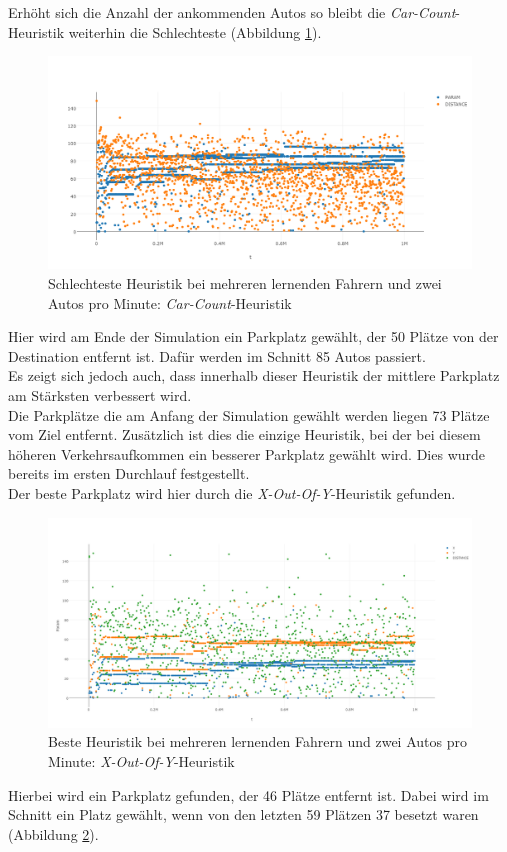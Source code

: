 Erhöht sich die Anzahl der ankommenden Autos so bleibt die \emph{Car-Count}-Heuristik weiterhin die Schlechteste (Abbildung \ref{fig:res_pm_2pm_worst}). 
\begin{figure}
	\includegraphics[width=\textwidth]{analyse/SomeMutants/2pm/car2some.png}
	\caption{Schlechteste Heuristik bei mehreren lernenden Fahrern und zwei Autos pro Minute: \emph{Car-Count}-Heuristik}\label{fig:res_pm_2pm_worst}
\end{figure}
Hier wird am Ende der Simulation ein Parkplatz gewählt, der 50 Plätze von der Destination entfernt ist. Dafür werden im Schnitt 85 Autos passiert.\\
Es zeigt sich jedoch auch, dass innerhalb dieser Heuristik der mittlere Parkplatz am Stärksten verbessert wird.\\
Die Parkplätze die am Anfang der Simulation gewählt werden liegen 73 Plätze vom Ziel entfernt. Zusätzlich ist dies die einzige Heuristik, bei der bei diesem höheren Verkehrsaufkommen ein besserer Parkplatz gewählt wird. Dies wurde bereits im ersten Durchlauf festgestellt.\\
Der beste Parkplatz wird hier durch die \emph{X-Out-Of-Y}-Heuristik gefunden.\\
\begin{figure}
	\includegraphics[width=\textwidth]{analyse/SomeMutants/2pm/xy.png}
	\caption{Beste Heuristik bei mehreren lernenden Fahrern und zwei Autos pro Minute: \emph{X-Out-Of-Y}-Heuristik}\label{fig:res_pm_2pm_best}
\end{figure}
Hierbei wird ein Parkplatz gefunden, der 46 Plätze entfernt ist. Dabei wird im Schnitt ein Platz gewählt, wenn von den letzten 59 Plätzen 37 besetzt waren (Abbildung \ref{fig:res_pm_2pm_best}).

